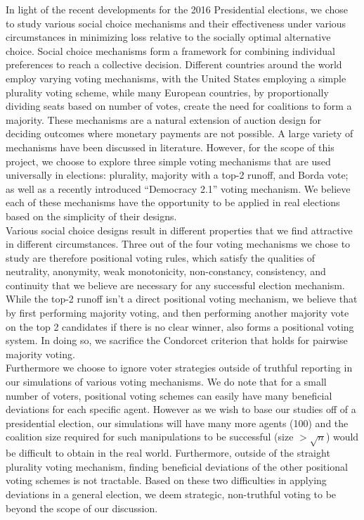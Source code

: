 \documentclass[11pt]{scrartcl}
\begin{document}
In light of the recent developments for the 2016 Presidential elections, we chose to study various social choice mechanisms and their effectiveness under various circumstances in minimizing loss relative to the socially optimal alternative choice. Social choice mechanisms form a framework for combining individual preferences to reach a collective decision. Different countries around the world employ varying voting mechanisms, with the United States employing a simple plurality voting scheme, while many European countries, by proportionally dividing seats based on number of votes, create the need for coalitions to form a majority. These mechanisms are a natural extension of auction design for deciding outcomes where monetary payments are not possible. A large variety of mechanisms have been discussed in literature. However, for the scope of this project, we choose to explore three simple voting mechanisms that are used universally in elections: plurality, majority with a top-2 runoff, and Borda vote; as well as a recently introduced ``Democracy 2.1'' voting mechanism. We believe each of these mechanisms have the opportunity to be applied in real elections based on the simplicity of their designs.\\

Various social choice designs result in different properties that we find attractive in different circumstances. Three out of the four voting mechanisms we chose to study are therefore positional voting rules, which satisfy the qualities of neutrality, anonymity, weak monotonicity, non-constancy, consistency, and continuity that we believe are necessary for any successful election mechanism. While the top-2 runoff isn't a direct positional voting mechanism, we believe that by first performing majority voting, and then performing another majority vote on the top 2 candidates if there is no clear winner, also forms a positional voting system. In doing so, we sacrifice the Condorcet criterion that holds for pairwise majority voting.\\

Furthermore we choose to ignore voter strategies outside of truthful reporting in our simulations of various voting mechanisms. We do note that for a small number of voters, positional voting schemes can easily have many beneficial deviations for each specific agent. However as we wish to base our studies off of a presidential election, our simulations will have many more agents (100) and the coalition size required for such manipulations to be successful (size $>\sqrt{n}$) would be difficult to obtain in the real world. Furthermore, outside of the straight plurality voting mechanism, finding beneficial deviations of the other positional voting schemes is not tractable. Based on these two difficulties in applying deviations in a general election, we deem strategic, non-truthful voting to be beyond the scope of our discussion.\\
\end{document}

